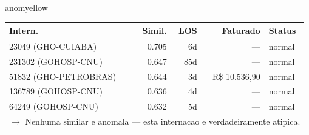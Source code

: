\documentclass[a4paper,10pt]{article}
\begin{document}
\begin{anomalycard}[Internacao 168364 | GHO-PETROBRAS | MODERADO (z=2.14)]{anomyellow}
\begin{tabular}{l r r r l}\toprule\textbf{Intern.} & \textbf{Simil.} & \textbf{LOS} & \textbf{Faturado} & \textbf{Status} \\\midrule
23049 (GHO-CUIABA) & 0.705 & 6d & --- & \textcolor{jcubeblue}{normal} \\
231302 (GOHOSP-CNU) & 0.647 & 85d & --- & \textcolor{jcubeblue}{normal} \\
51832 (GHO-PETROBRAS) & 0.644 & 3d & R\$ 10.536,90 & \textcolor{jcubeblue}{normal} \\
136789 (GOHOSP-CNU) & 0.636 & 4d & --- & \textcolor{jcubeblue}{normal} \\
64249 (GOHOSP-CNU) & 0.632 & 5d & --- & \textcolor{jcubeblue}{normal} \\
\multicolumn{5}{l}{\textcolor{jcubeblue}{\small $\rightarrow$ Nenhuma similar e anomala --- esta internacao e verdadeiramente atipica.}} \\
\bottomrule\end{tabular}


\end{anomalycard}

\newpage
\end{document}
